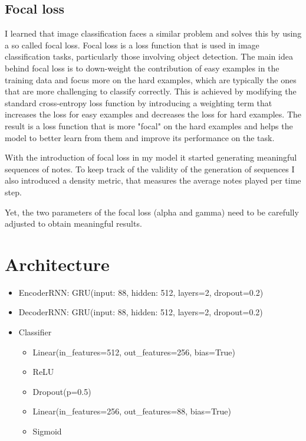 \documentclass[a4paper, 10pt, xcolor=dvipsnames]{article} %
\begin{document}
\subsection{Focal loss}

I learned that image classification faces a similar problem and solves this by
using a so called focal loss. Focal loss is a loss function that is used in
image classification tasks, particularly those involving object detection. The
main idea behind focal loss is to down-weight the contribution of easy examples
in the training data and focus more on the hard examples, which are typically
the ones that are more challenging to classify correctly. This is achieved by
modifying the standard cross-entropy loss function by introducing a weighting
term that increases the loss for easy examples and decreases the loss for hard
examples. The result is a loss function that is more "focal" on the hard
examples and helps the model to better learn from them and improve its
performance on the task.

With the introduction of focal loss in my model it started generating
meaningful sequences of notes. To keep track of the validity of the generation
of sequences I also introduced a density metric, that measures the average
notes played per time step.

Yet, the two parameters of the focal loss (alpha and gamma) need to be
carefully adjusted to obtain meaningful results.


\section{Architecture}
\begin{itemize}
  \item EncoderRNN: GRU(input: 88, hidden: 512, layers=2, dropout=0.2)
  \item DecoderRNN: GRU(input: 88, hidden: 512, layers=2, dropout=0.2)
  \item Classifier
        \begin{itemize}
          \item  Linear(in\_features=512, out\_features=256, bias=True)
          \item  ReLU
          \item  Dropout(p=0.5)
          \item  Linear(in\_features=256, out\_features=88, bias=True)
          \item  Sigmoid
        \end{itemize}
\end{itemize}
\end{document}

